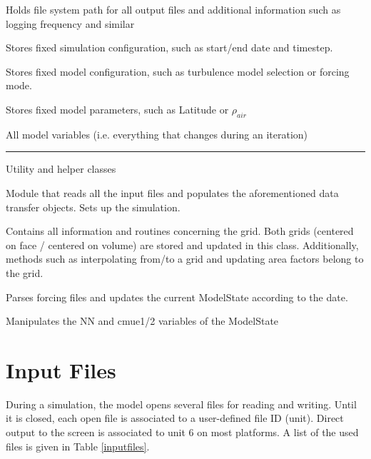 \documentclass[paper=a4, fontsize=12pt]{article}
\begin{document}
\begin{description}[style=nextline]
\begin{description}[style=multiline, leftmargin=17em]
		\item[OutputConfig] Holds file system path for all output files and additional information such as logging frequency and similar
		
		\item[SimConfig] Stores fixed simulation configuration, such as start/end date and timestep. 

		\item[ModelConfig] Stores fixed model configuration, such as turbulence model selection or forcing mode.
		
		\item[ModelParam] Stores fixed model parameters, such as Latitude or $\rho_{air}$
		
		\item[ModelState] All model variables (i.e. everything that changes during an iteration)
\end{description}

 \hrule
\item[Special classes] \noindent Utility and helper classes  
 \begin{description}[style=multiline, leftmargin=17em]
		\item[Inputfile] Module that reads all the input files and populates the aforementioned data transfer objects. Sets up the simulation.
		
		\item[Grid] Contains all information and routines concerning the grid. Both grids (centered on face / centered on volume) are stored and updated in this class. Additionally, methods such as interpolating from/to a grid and updating area factors belong to the grid.
		
		\item[Forcing] Parses forcing files and updates the current ModelState according to the date.

		\item[Stability] Manipulates the NN and cmue1/2 variables of the ModelState
		
		
		
\end{description}
\end{description}



\section{Input Files}
During a simulation, the model opens several files for reading and writing. Until it is closed, each open file is associated to a user-defined file ID (unit). Direct output to the screen is associated to unit 6 on most platforms. A list of the used files is given in Table \ref{inputfiles}.
\end{document}

